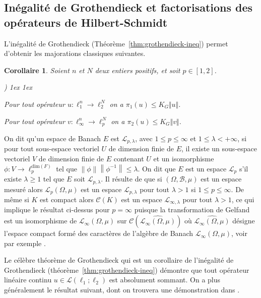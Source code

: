 \documentclass{smfart}
\theoremstyle{plain}
\newtheorem{corollary}[theorem]{Corollaire}
\theoremstyle{definition}
\newcommand {\DIM}{\text{dim}}
\newcommand {\ELL} {{\mathcal L}}
\newcommand {\BOUNDED} {{\mathcal L}}
\newcounter{aufzi}
\newenvironment{aufzi}{\begin{list}{ {\upshape\alph{aufzi})}}{
        \usecounter{aufzi}
        \topsep1ex
        \parsep0cm
        \itemsep1ex
        \leftmargin0.8cm
        \labelwidth0.5cm
        \labelsep0.3cm
}}
{\end{list}}
\begin{document}
\subsection{Inégalité de Grothendieck  et factorisations des opérateurs de Hilbert-Schmidt}

L'inégalité de Grothendieck (Théorème~\ref{thm:grothendieck-ineq}) permet
d'obtenir les majorations classiques suivantes.

\begin{corollary} Soient $n$ et $N$ deux entiers positifs, et soit $p\in [1,2]$.
\begin{aufzi}
\item Pour tout opérateur $u: \ell_1^n\to \ell_2^N$ on a $\pi_1(u)\le K_G\Vert u \Vert$.
\item Pour tout opérateur $v: \ell_{\infty}^n\to \ell_p^N$ on a $\pi_2(u)\le K_G \Vert v \Vert$.
\end{aufzi}
\end{corollary}

On dit qu'un espace de Banach $E$ est $\mathcal{L}_{p,\lambda}$, avec
$1\leq p\leq\infty$ et $1\leq\lambda <+\infty$, si pour tout
sous-espace vectoriel $U$ de dimension finie de $E$, il existe un
sous-espace vectoriel $V$ de dimension finie de $E$ contenant $U$ et
un isomorphisme $\phi:V\rightarrow \ell_{p}^{\DIM(F)}$ tel que
$\left\|\phi\right\|\left\|\phi^{-1}\right\|\leq\lambda$. On dit que
$E$ est un espace $\mathcal{L}_{p}$ s'il existe $\lambda \ge 1$ tel
que $E$ soit $\mathcal{L}_{p,\lambda}$. Il résulte de \cite[Théorème
3.2]{DJT} que si $(\Omega, {\mathcal B}, \mu)$ est un espace mesuré
alors $\ELL_p(\Omega, \mu)$ est un espace $\ELL_{p,\lambda}$ pour tout
$\lambda>1$ si $1\le p \le {\infty}$. De même si $K$ est compact alors
${\mathcal C}(K)$ est un espace $\ELL_{\infty, \lambda}$ pour tout
$\lambda >1$, ce qui implique le résultat ci-dessus pour $p=\infty$
puisque la transformation de Gelfand est un isomorphisme de
$\ELL_{\infty}(\Omega,\mu)$ sur ${\mathcal C}\left (\widehat
  {\ELL_{\infty}(\Omega, \mu)}\right )$ où $\widehat {\ELL_{\infty}(\Omega,
  \mu)}$ désigne l'espace compact formé des caractères de l'algèbre de
Banach $\ELL_{\infty}(\Omega,\mu)$, voir par exemple \cite{DAL}.

Le célèbre théorème de Grothendieck qui est un corollaire de
l'inégalité de Grothendieck (théorème~\ref{thm:grothendieck-ineq})
démontre que tout opérateur linéaire continu $u \in \BOUNDED(\ell_1 ;
\ell_2)$ est absolument sommant. On a plus généralement le résultat
suivant, dont on trouvera une démonstration dans \cite[Chapitre
3]{DJT}.
\end{document}
